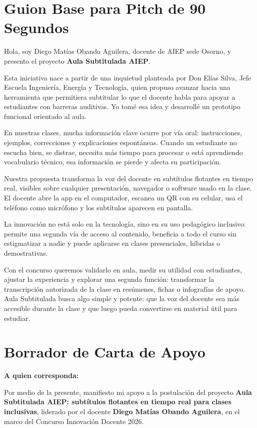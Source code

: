 \documentclass[11pt,letterpaper]{article}
\begin{document}
\section{Guion Base para Pitch de 90 Segundos}

Hola, soy Diego Matías Obando Aguilera, docente de AIEP sede Osorno, y presento el proyecto \textbf{Aula Subtitulada AIEP}.

Esta iniciativa nace a partir de una inquietud planteada por Don Elías Silva, Jefe Escuela Ingeniería, Energía y Tecnología, quien propuso avanzar hacia una herramienta que permitiera subtitular lo que el docente habla para apoyar a estudiantes con barreras auditivas. Yo tomé esa idea y desarrollé un prototipo funcional orientado al aula.

En nuestras clases, mucha información clave ocurre por vía oral: instrucciones, ejemplos, correcciones y explicaciones espontáneas. Cuando un estudiante no escucha bien, se distrae, necesita más tiempo para procesar o está aprendiendo vocabulario técnico, esa información se pierde y afecta su participación.

Nuestra propuesta transforma la voz del docente en subtítulos flotantes en tiempo real, visibles sobre cualquier presentación, navegador o software usado en la clase. El docente abre la app en el computador, escanea un QR con su celular, usa el teléfono como micrófono y los subtítulos aparecen en pantalla.

La innovación no está solo en la tecnología, sino en su uso pedagógico inclusivo: permite una segunda vía de acceso al contenido, beneficia a todo el curso sin estigmatizar a nadie y puede aplicarse en clases presenciales, híbridas o demostrativas.

Con el concurso queremos validarlo en aula, medir su utilidad con estudiantes, ajustar la experiencia y explorar una segunda función: transformar la transcripción autorizada de la clase en resúmenes, fichas o infografías de apoyo. Aula Subtitulada busca algo simple y potente: que la voz del docente sea más accesible durante la clase y que luego pueda convertirse en material útil para estudiar.

\section{Borrador de Carta de Apoyo}

\textbf{A quien corresponda:}

Por medio de la presente, manifiesto mi apoyo a la postulación del proyecto \textbf{Aula Subtitulada AIEP: subtítulos flotantes en tiempo real para clases inclusivas}, liderado por el docente \textbf{Diego Matías Obando Aguilera}, en el marco del Concurso Innovación Docente 2026.
\end{document}

